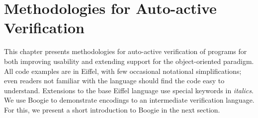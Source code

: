 \chapter{Methodologies for Auto-active Verification}
\label{sec:method}

This chapter presents methodologies for auto-active verification of programs for both improving usability and extending support for the object-oriented paradigm. All code examples are in Eiffel, with few occasional notational simplifications; even readers not familiar with the language should find the code easy to understand. Extensions to the base Eiffel language use special keywords in \emph{italics}. We use Boogie to demonstrate encodings to an intermediate verification language. For this, we present a short introduction to Boogie in the next section.
